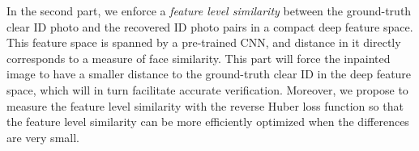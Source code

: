 \documentclass[10pt,twocolumn,letterpaper]{article}
\begin{document}

In the second part, we enforce a \textit{feature level similarity} between the ground-truth clear ID photo and the recovered ID photo pairs in a compact deep feature space. This feature space is spanned by a pre-trained CNN, and distance in it directly corresponds to a measure of face similarity. This part will force the inpainted image to have a smaller distance to the ground-truth clear ID in the deep feature space, which will in turn facilitate accurate verification. Moreover, we propose to measure the feature level similarity with the reverse Huber loss function so that the feature level similarity can be more efficiently optimized when the differences are very small.







\end{document}
